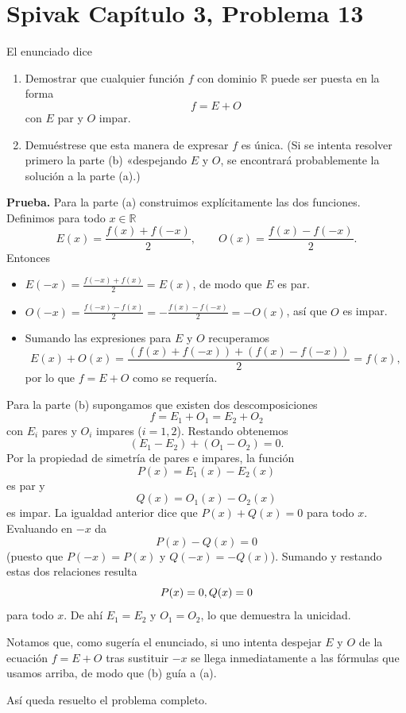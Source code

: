 \section*{Spivak Capítulo 3, Problema 13}

El enunciado dice
\begin{enumerate}[label=(\alph*)]
\item Demostrar que cualquier función $f$ con dominio $\mathbb{R}$ puede ser puesta en la forma
$$f=E+O$$
con $E$ par y $O$ impar.
\item Demuéstrese que esta manera de expresar $f$ es única. (Si se intenta resolver primero la parte (b) «despejando $E$ y $O$, se encontrará probablemente la solución a la parte (a).)
\end{enumerate}

\textbf{Prueba.}
Para la parte (a) construimos explícitamente las dos funciones. Definimos para todo $x\in\mathbb{R}$
\[ E(x)=\frac{f(x)+f(-x)}2, \qquad O(x)=\frac{f(x)-f(-x)}2.\]
Entonces
\begin{itemize}
\item $E(-x)=\frac{f(-x)+f(x)}2=E(x)$, de modo que $E$ es par.
\item $O(-x)=\frac{f(-x)-f(x)}2=-\frac{f(x)-f(-x)}2=-O(x)$, así que $O$ es impar.
\item Sumando las expresiones para $E$ y $O$ recuperamos
$$E(x)+O(x)=\frac{(f(x)+f(-x))+(f(x)-f(-x))}2=f(x),$$
por lo que $f=E+O$ como se requería.
\end{itemize}

Para la parte (b) supongamos que existen dos descomposiciones
$$f=E_1+O_1=E_2+O_2$$
con $E_i$ pares y $O_i$ impares ($i=1,2$). Restando obtenemos
$$(E_1-E_2)+(O_1-O_2)=0.$$ Por la propiedad de simetría de pares e impares, la función
$$P(x)=E_1(x)-E_2(x)$$
es par y
$$Q(x)=O_1(x)-O_2(x)$$
es impar. La igualdad anterior dice que $P(x)+Q(x)=0$ para todo $x$. Evaluando en $-x$ da
$$P(x)-Q(x)=0$$
(puesto que $P(-x)=P(x)$ y $Q(-x)=-Q(x)$). Sumando y restando estas dos relaciones resulta
$$P(x)=0,\\ Q(x)=0$$
para todo $x$. De ahí $E_1=E_2$ y $O_1=O_2$, lo que demuestra la unicidad.

Notamos que, como sugería el enunciado, si uno intenta despejar $E$ y $O$ de la ecuación
$f=E+O$ tras sustituir $-x$ se llega inmediatamente a las fórmulas que usamos arriba, de modo que (b) guía a (a).

Así queda resuelto el problema completo.